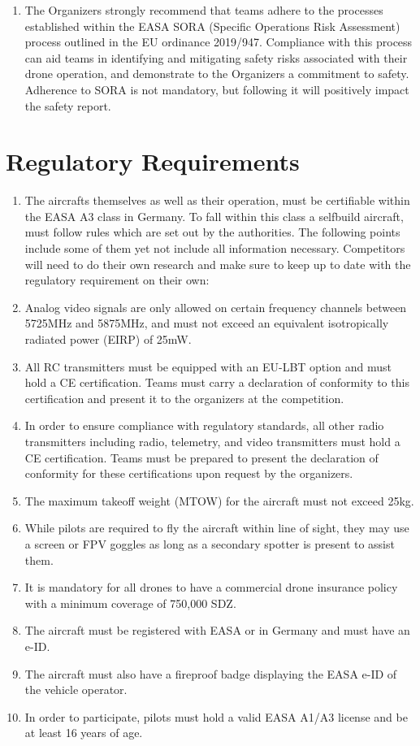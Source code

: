 \documentclass{article}
\begin{document}
\begin{enumerate}
  \item The Organizers strongly recommend that teams adhere to the processes established within the EASA SORA (Specific Operations Risk Assessment) process outlined in the EU ordinance 2019/947. Compliance with this process can aid teams in identifying and mitigating safety risks associated with their drone operation, and demonstrate to the Organizers a commitment to safety. Adherence to SORA is not mandatory, but following it will positively impact the safety report.
\end{enumerate}


\section{Regulatory Requirements}
\begin{enumerate}
  \item The aircrafts themselves as well as their operation, must be certifiable within the EASA A3 class in Germany. To fall within this class a selfbuild aircraft, must follow rules which are set out by the authorities. 
  The following points include some of them yet not include all information necessary. Competitors will need to do their own research and make sure to keep up to date with the regulatory requirement on their own:
  \item Analog video signals are only allowed on certain frequency channels between 5725MHz and 5875MHz, and must not exceed an equivalent isotropically radiated power (EIRP) of 25mW.
  \item All RC transmitters must be equipped with an EU-LBT option and must hold a CE certification. Teams must carry a declaration of conformity to this certification and present it to the organizers at the competition.
  \item In order to ensure compliance with regulatory standards, all other radio transmitters including radio, telemetry, and video transmitters must hold a CE certification. Teams must be prepared to present the declaration of conformity for these certifications upon request by the organizers.
  \item The maximum takeoff weight (MTOW) for the aircraft must not exceed 25kg.
  \item While pilots are required to fly the aircraft within line of sight, they may use a screen or FPV goggles as long as a secondary spotter is present to assist them.
  \item It is mandatory for all drones to have a commercial drone insurance policy with a minimum coverage of 750,000 SDZ.
  \item The aircraft must be registered with EASA or in Germany and must have an e-ID.
  \item The aircraft must also have a fireproof badge displaying the EASA e-ID of the vehicle operator.
  \item In order to participate, pilots must hold a valid EASA A1/A3 license and be at least 16 years of age.
\end{enumerate}
\end{document}
